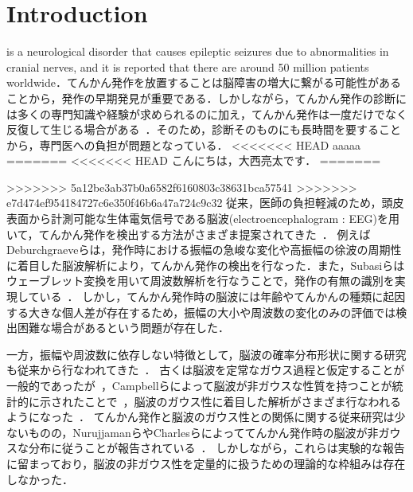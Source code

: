 \documentclass[journal]{IEEEtran}
\begin{document}
\section{Introduction}
%
%
%
%
 is a neurological disorder that causes epileptic seizures due to abnormalities in cranial nerves, and it is reported that there are around 50 million patients worldwide\cite{WHO}．てんかん発作を放置することは脳障害の増大に繋がる可能性があることから，発作の早期発見が重要である．しかしながら，てんかん発作の診断には多くの専門知識や経験が求められるのに加え，てんかん発作は一度だけでなく反復して生じる場合がある~\cite{ep2011}．そのため，診断そのものにも長時間を要することから，専門医への負担が問題となっている．
<<<<<<< HEAD
aaaaa
=======
<<<<<<< HEAD
こんにちは，大西亮太です．
=======

>>>>>>> 5a12be3ab37b0a6582f6160803c38631bca57541
>>>>>>> e7d474ef954184727c6e350f46b6a47a724c9c32
従来，医師の負担軽減のため，頭皮表面から計測可能な生体電気信号である脳波(electroencephalogram : EEG)を用いて，てんかん発作を検出する方法がさまざま提案されてきた~\cite{Deburchgraeve2008,Subasi2005,kellaway1979precise,Panzica1999,fusco1993ictal,Acir2005,Greene2008}．
例えばDeburchgraeveらは，発作時における振幅の急峻な変化や高振幅の徐波の周期性に着目した脳波解析により，てんかん発作の検出を行なった\cite{Deburchgraeve2008}．また，Subasiらはウェーブレット変換を用いて周波数解析を行なうことで，発作の有無の識別を実現している~\cite{Subasi2005}．
しかし，てんかん発作時の脳波には年齢やてんかんの種類に起因する大きな個人差が存在するため，振幅の大小や周波数の変化のみの評価では検出困難な場合があるという問題が存在した．

一方，振幅や周波数に依存しない特徴として，脳波の確率分布形状に関する研究も従来から行なわれてきた~\cite{Sounders1963,Gonen2012,Campbell1967,Weiss1973,Nurujjaman2009,Charles1999}．
古くは脳波を定常なガウス過程と仮定することが一般的であったが~\cite{Sounders1963,Gonen2012}，Campbellらによって脳波が非ガウスな性質を持つことが統計的に示されたことで~\cite{Campbell1967}，脳波のガウス性に着目した解析がさまざま行なわれるようになった~\cite{Gonen2012,Weiss1973,Nurujjaman2009,Charles1999}．
てんかん発作と脳波のガウス性との関係に関する従来研究は少ないものの，NurujjamanらやCharlesらによっててんかん発作時の脳波が非ガウスな分布に従うことが報告されている~\cite{Nurujjaman2009,Charles1999}．
しかしながら，これらは実験的な報告に留まっており，脳波の非ガウス性を定量的に扱うための理論的な枠組みは存在しなかった．
\end{document}
